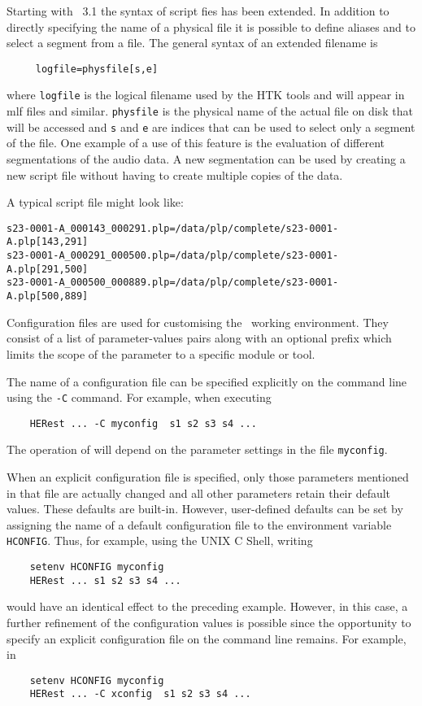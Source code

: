 Starting with \HTK\ 3.1 the syntax of script fies has been extended.
In addition to directly specifying the name of a physical file it is
possible to define aliases and to select a segment from a file. The
general syntax of an extended filename  is
\begin{verbatim}
     logfile=physfile[s,e]   
\end{verbatim}
where \texttt{logfile} is the logical filename used by the HTK tools
and will appear in mlf files and similar. \texttt{physfile} is the
physical name of the actual file on disk that will be accessed and
\texttt{s} and \texttt{e} are indices that can be used to select only
a segment of the file. One example of a use of this feature is the
evaluation of different segmentations of the audio data. A new
segmentation can be used by creating a new script file without having
to create multiple copies of the data.

A typical script file might look like:
\begin{verbatim}
s23-0001-A_000143_000291.plp=/data/plp/complete/s23-0001-A.plp[143,291]
s23-0001-A_000291_000500.plp=/data/plp/complete/s23-0001-A.plp[291,500]
s23-0001-A_000500_000889.plp=/data/plp/complete/s23-0001-A.plp[500,889]
\end{verbatim}



Configuration files 
are used for customising the \HTK\ working environment.
They consist of a list of parameter-values pairs along with an optional
prefix which limits the scope of the parameter to a specific module
or tool.

The name of a configuration file can be specified explicitly on the
command line using the \texttt{-C} command.  For example, when executing
\begin{verbatim}
    HERest ... -C myconfig  s1 s2 s3 s4 ...
\end{verbatim}
The operation of  will depend on the parameter settings
in the file \texttt{myconfig}.    

When an explicit configuration file is specified, only those parameters mentioned
in that file are actually changed and all other parameters retain their
default values.  These defaults are built-in.  However, user-defined defaults
can be set by assigning the name of a default configuration file to
the environment variable \texttt{HCONFIG}.
Thus, for example, using the UNIX C Shell, writing
\begin{verbatim}
    setenv HCONFIG myconfig
    HERest ... s1 s2 s3 s4 ...
\end{verbatim}
would have an identical effect to the preceding example.  However, in this
case, a further refinement of the configuration values is possible since
the opportunity to specify an explicit configuration file on the command
line remains.  For example, in
\begin{verbatim}
    setenv HCONFIG myconfig
    HERest ... -C xconfig  s1 s2 s3 s4 ...
\end{verbatim}

